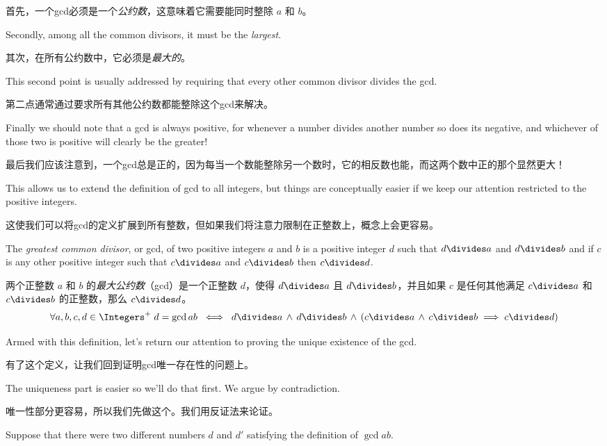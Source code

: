 首先，一个gcd必须是一个\emph{公约数}，这意味着它需要能同时整除 $a$ 和 $b$。

Secondly, among all the common 
divisors, it must be the \emph{largest}.

其次，在所有公约数中，它必须是\emph{最大的}。

This second point is usually 
addressed
by requiring that every other common divisor divides the gcd.

第二点通常通过要求所有其他公约数都能整除这个gcd来解决。

Finally we 
should note that a gcd is always positive, for whenever a number divides
another number so does its negative, and whichever of those two is positive
will clearly be the greater!

最后我们应该注意到，一个gcd总是正的，因为每当一个数能整除另一个数时，它的相反数也能，而这两个数中正的那个显然更大！

This allows us to extend the definition of
gcd to all integers, but things are conceptually easier if we 
keep our attention restricted to the positive integers.

这使我们可以将gcd的定义扩展到所有整数，但如果我们将注意力限制在正整数上，概念上会更容易。

\begin{defi}
The \emph{greatest common divisor}, or gcd, of two positive 
integers $a$ and $b$
is a positive integer $d$ such that $d \divides a$ and $d \divides b$ and if $c$ is any
other positive integer such that $c \divides a$ and $c \divides b$ then $c \divides d$.

两个正整数 $a$ 和 $b$ 的\emph{最大公约数}（gcd）是一个正整数 $d$，使得 $d \divides a$ 且 $d \divides b$，并且如果 $c$ 是任何其他满足 $c \divides a$ 和 $c \divides b$ 的正整数，那么 $c \divides d$。
\[ \forall a,b,c,d \in \Integers^+ \; d=\gcd{a}{b} \; \iff \; d \divides a \, \land \, d \divides b \, \land \, (c \divides a \, \land \, c \divides b  \implies c \divides d)\]
\end{defi}

Armed with this definition, let's return our attention to proving the
unique existence of the gcd.

有了这个定义，让我们回到证明gcd唯一存在性的问题上。

The uniqueness part is easier so we'll
do that first.  We argue by contradiction.

唯一性部分更容易，所以我们先做这个。我们用反证法来论证。

Suppose that there were
two different numbers $d$ and $d'$ satisfying the definition of $\gcd{a}{b}$.

